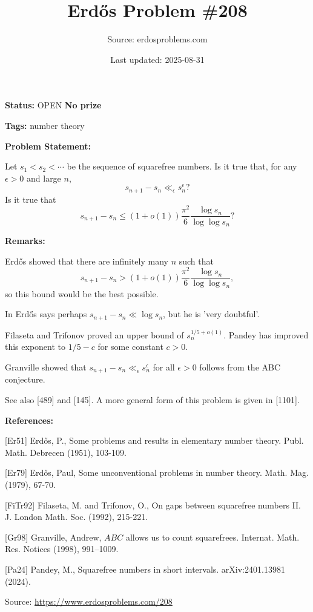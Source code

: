 \documentclass{article}
\title{Erd\H{o}s Problem \#208}
\date{Last updated: 2025-08-31}
\author{Source: erdosproblems.com}
\begin{document}
\maketitle

\noindent\textbf{Status:} OPEN \quad \textbf{No prize}

\noindent\textbf{Tags:} number theory

\medskip
\noindent\textbf{Problem Statement:}

Let $s_1<s_2<\cdots$ be the sequence of squarefree numbers. Is it true that, for any $\epsilon>0$ and large $n$,\[s_{n+1}-s_n \ll_\epsilon s_n^{\epsilon}?\]Is it true that\[s_{n+1}-s_n \leq (1+o(1))\frac{\pi^2}{6}\frac{\log s_n}{\log\log s_n}?\]

\bigskip
\noindent\textbf{Remarks:}

Erd\H{o}s \cite{Er51} showed that there are infinitely many $n$ such that\[s_{n+1}-s_n > (1+o(1))\frac{\pi^2}{6}\frac{\log s_n}{\log\log s_n},\]so this bound would be the best possible. 

In \cite{Er79} Erd\H{o}s says perhaps $s_{n+1}-s_n \ll \log s_n$, but he is 'very doubtful'.

Filaseta and Trifonov \cite{FiTr92} proved an upper bound of $s_n^{1/5+o(1)}$. Pandey \cite{Pa24} has improved this exponent to $1/5-c$ for some constant $c>0$.

Granville \cite{Gr98} showed that $s_{n+1}-s_n\ll_\epsilon s_n^\epsilon$ for all $\epsilon>0$ follows from the ABC conjecture.

See also [489] and [145]. A more general form of this problem is given in [1101].

\bigskip
\noindent\textbf{References:}

[Er51] Erd\H{o}s, P., Some problems and results in elementary number theory. Publ. Math. Debrecen (1951), 103-109.
 
 [Er79] Erd\H{o}s, Paul, Some unconventional problems in number theory. Math. Mag. (1979), 67-70.
 
 [FiTr92] Filaseta, M. and Trifonov, O., On gaps between squarefree numbers II. J. London Math. Soc. (1992), 215-221.
 
 [Gr98] Granville, Andrew, {$ABC$} allows us to count squarefrees. Internat. Math. Res. Notices (1998), 991--1009.
 
 [Pa24] Pandey, M., Squarefree numbers in short intervals. arXiv:2401.13981 (2024).

\bigskip
\noindent\small{Source: \url{https://www.erdosproblems.com/208}}
\end{document}

